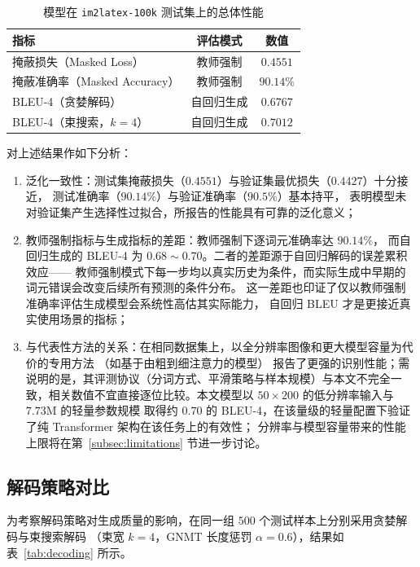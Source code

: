 \begin{table}[H]
    \centering
    \caption{模型在 \texttt{im2latex-100k} 测试集上的总体性能}
    \begin{tabular}{lcc}
        \toprule
        \textbf{指标} & \textbf{评估模式} & \textbf{数值} \\
        \midrule
        掩蔽损失（Masked Loss） & 教师强制 & $0.4551$ \\
        掩蔽准确率（Masked Accuracy） & 教师强制 & $90.14\%$ \\
        BLEU-4（贪婪解码） & 自回归生成 & $0.6767$ \\
        BLEU-4（束搜索，$k=4$） & 自回归生成 & $\mathbf{0.7012}$ \\
        \bottomrule
    \end{tabular}
    \label{tab:results}
\end{table}

对上述结果作如下分析：
\begin{enumerate}[label={（\arabic*）}, leftmargin=2em, labelsep=0.5em, itemsep=0pt]
    \item {泛化一致性}：测试集掩蔽损失（$0.4551$）与验证集最优损失（$0.4427$）十分接近，
    测试准确率（$90.14\%$）与验证准确率（$90.5\%$）基本持平，
    表明模型未对验证集产生选择性过拟合，所报告的性能具有可靠的泛化意义；
    \item {教师强制指标与生成指标的差距}：教师强制下逐词元准确率达 $90.14\%$，
    而自回归生成的 BLEU-4 为 $0.68 \sim 0.70$。二者的差距源于自回归解码的误差累积效应——
    教师强制模式下每一步均以真实历史为条件，而实际生成中早期的词元错误会改变后续所有预测的条件分布。
    这一差距也印证了仅以教师强制准确率评估生成模型会系统性高估其实际能力，
    自回归 BLEU 才是更接近真实使用场景的指标；
    \item {与代表性方法的关系}：在相同数据集上，以全分辨率图像和更大模型容量为代价的专用方法
    （如基于由粗到细注意力的模型\supercite{dengImagetomarkupGenerationCoarsetofine2017}）
    报告了更强的识别性能；需说明的是，其评测协议（分词方式、平滑策略与样本规模）与本文不完全一致，相关数值不宜直接逐位比较。本文模型以 $50\times200$ 的低分辨率输入与 $7.73$M 的轻量参数规模
    取得约 $0.70$ 的 BLEU-4，在该量级的轻量配置下验证了纯 Transformer 架构在该任务上的有效性；
    分辨率与模型容量带来的性能上限将在第~\ref{subsec:limitations} 节进一步讨论。
\end{enumerate}

\subsection{解码策略对比}
为考察解码策略对生成质量的影响，在同一组 $500$ 个测试样本上分别采用贪婪解码与束搜索解码
（束宽 $k=4$，GNMT 长度惩罚\supercite{wuGoogleNeuralMachine2016} $\alpha=0.6$）\supercite{vaswaniAttentionAllYou2017}，结果如表~\ref{tab:decoding} 所示。

